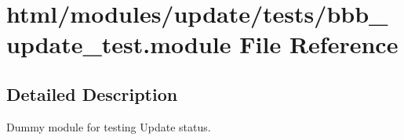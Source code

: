 \hypertarget{bbb__update__test_8module}{
\section{html/modules/update/tests/bbb\_\-update\_\-test.module File Reference}
\label{bbb__update__test_8module}
}


\subsection{Detailed Description}
Dummy module for testing Update status. 